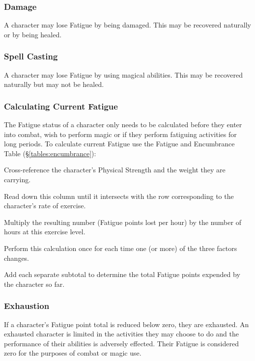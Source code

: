 \begin{multicols*}{3}
\subsubsection{Damage}

A character may lose Fatigue by being damaged.  This may be recovered
naturally or by being healed.

\subsubsection{Spell Casting}

A character may lose Fatigue by using magical abilities.  This may be
recovered naturally but may not be healed.

\subsubsection{Calculating Current Fatigue}
\label{adventure:fatigue}

The Fatigue status of a character only needs to be calculated before
they enter into combat, wish to perform magic or if they perform
fatiguing activities for long periods.  To calculate current Fatigue
use the Fatigue and Encumbrance Table (\S\ref{tables:encumbrance}):
\begin{Enumerate}
\item
Cross-reference the character's Physical Strength and the weight they
are carrying.

\item
Read down this column until it intersects with the row corresponding
to the character's rate of exercise.

\item
Multiply the resulting number (Fatigue points lost per hour) by the
number of hours at this exercise level.

\item
Perform this calculation once for each time one (or more) of the three
factors changes.

\item
Add each separate subtotal to determine the total Fatigue points
expended by the character so far.
\end{Enumerate}

\subsubsection{Exhaustion}

If a character's Fatigue point total is reduced below zero, they are
exhausted. An exhausted character is limited in the activities they
may choose to do and the performance of their abilities is adversely
effected. Their Fatigue is considered zero for the purposes of combat
or magic use.


\end{multicols*}
